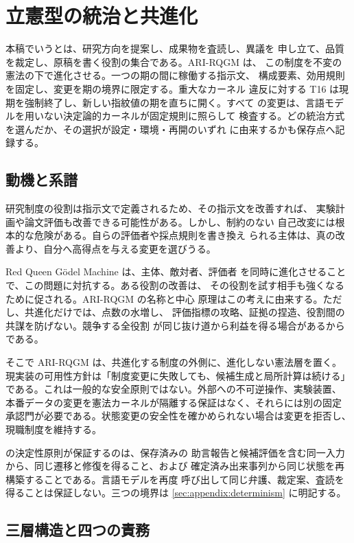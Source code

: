 \section{立憲型の統治と共進化}\label{sec:rqgm}

本稿でいうとは、研究方向を提案し、成果物を査読し、異議を
申し立て、品質を裁定し、原稿を書く役割の集合である。ARI-RQGM は、
この制度を不変の憲法の下で進化させる。一つの期の間に稼働する指示文、
構成要素、効用規則を固定し、変更を期の境界に限定する。重大なカーネル
違反に対する T16 は現期を強制終了し、新しい指紋値の期を直ちに開く。すべて
の変更は、言語モデルを用いない決定論的カーネルが固定規則に照らして
検査する。どの統治方式を選んだか、その選択が設定・環境・再開のいずれ
に由来するかも保存点へ記録する。

\subsection{動機と系譜}\label{sec:rqgm:motivation}

研究制度の役割は指示文で定義されるため、その指示文を改善すれば、
実験計画や論文評価も改善できる可能性がある。しかし、制約のない
自己改変には根本的な危険がある。自らの評価者や採点規則を書き換え
られる主体は、真の改善より、自分へ高得点を与える変更を選びうる。

Red Queen G\"odel Machine \cite{iacob2026red} は、主体、敵対者、評価者
を同時に進化させることで、この問題に対抗する。ある役割の改善は、
その役割を試す相手も強くなるために促される。ARI-RQGM の名称と中心
原理はこの考えに由来する。ただし、共進化だけでは、点数の水増し、
評価指標の攻略、証拠の捏造、役割間の共謀を防げない。競争する全役割
が同じ抜け道から利益を得る場合があるからである。

そこで ARI-RQGM は、共進化する制度の外側に、進化しない憲法層を置く。
現実装の可用性方針は「制度変更に失敗しても、候補生成と局所計算は続ける」
である。これは一般的な安全原則ではない。外部への不可逆操作、実験装置、
本番データの変更を憲法カーネルが隔離する保証はなく、それらには別の固定
承認門が必要である。状態変更の安全性を確かめられない場合は変更を拒否し、
現職制度を維持する。

 の決定性原則が保証するのは、保存済みの
助言報告と候補評価を含む同一入力から、同じ遷移と修復を得ること、および
確定済み出来事列から同じ状態を再構築することである。言語モデルを再度
呼び出して同じ弁護、裁定案、査読を得ることは保証しない。三つの境界は
\cref{sec:appendix:determinism} に明記する。

\subsection{三層構造と四つの責務}\label{sec:rqgm:layers}

